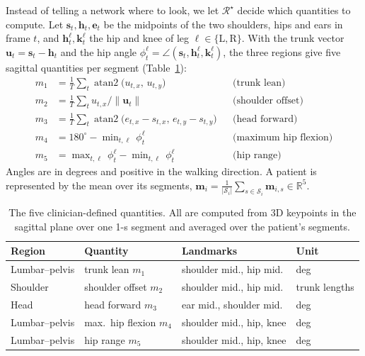 Instead of telling a network where to look, we let $\mathcal{R}^{\star}$ decide which
quantities to compute. Let $\mathbf{s}_t,\mathbf{h}_t,\mathbf{e}_t$ be the midpoints of the
two shoulders, hips and ears in frame $t$, and $\mathbf{h}^{\ell}_t,\mathbf{k}^{\ell}_t$ the
hip and knee of leg $\ell\in\{\mathrm{L},\mathrm{R}\}$. With the trunk vector
$\mathbf{u}_t=\mathbf{s}_t-\mathbf{h}_t$ and the hip angle
$\phi^{\ell}_t=\angle(\mathbf{s}_t,\mathbf{h}^{\ell}_t,\mathbf{k}^{\ell}_t)$, the three
regions give five sagittal quantities per segment (Table~\ref{tab:quantities}):
\begin{align}
m_1 &= \tfrac1T\textstyle\sum_t \operatorname{atan2}\!\big(u_{t,x},\,u_{t,y}\big) && \text{(trunk lean)} \nonumber\\
m_2 &= \tfrac1T\textstyle\sum_t u_{t,x}/\lVert\mathbf{u}_t\rVert && \text{(shoulder offset)} \nonumber\\
m_3 &= \tfrac1T\textstyle\sum_t \operatorname{atan2}\!\big(e_{t,x}-s_{t,x},\,e_{t,y}-s_{t,y}\big) && \text{(head forward)} \label{eq:quantities}\\
m_4 &= 180^\circ-\min\nolimits_{t,\ell}\,\phi^{\ell}_t && \text{(maximum hip flexion)} \nonumber\\
m_5 &= \max\nolimits_{t,\ell}\,\phi^{\ell}_t-\min\nolimits_{t,\ell}\,\phi^{\ell}_t && \text{(hip range)} \nonumber
\end{align}
Angles are in degrees and positive in the walking direction. A patient is represented by the
mean over its segments, $\mathbf{m}_i=\frac{1}{|\mathcal{S}_i|}\sum_{s\in\mathcal{S}_i}\mathbf{m}_{i,s}\in\mathbb{R}^5$.

\begin{table}[t]
\centering
\caption{The five clinician-defined quantities. All are computed from 3D keypoints in the
sagittal plane over one 1-s segment and averaged over the patient's segments.}
\label{tab:quantities}
\setlength{\tabcolsep}{5pt}
\begin{tabular}{@{}llll@{}}
\toprule
Region & Quantity & Landmarks & Unit \\
\midrule
Lumbar--pelvis & trunk lean $m_1$ & shoulder mid., hip mid. & deg \\
Shoulder & shoulder offset $m_2$ & shoulder mid., hip mid. & trunk lengths \\
Head & head forward $m_3$ & ear mid., shoulder mid. & deg \\
Lumbar--pelvis & max.\ hip flexion $m_4$ & shoulder mid., hip, knee & deg \\
Lumbar--pelvis & hip range $m_5$ & shoulder mid., hip, knee & deg \\
\bottomrule
\end{tabular}
\end{table}

